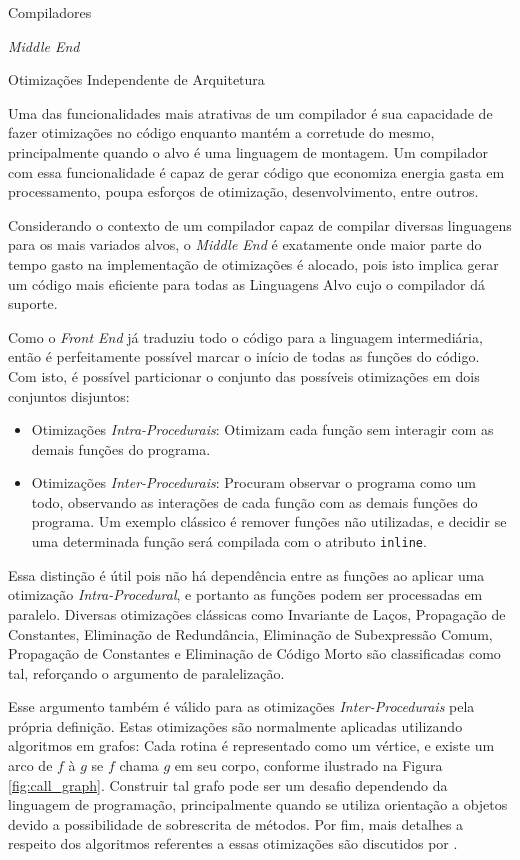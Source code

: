 \begin{section}{Compiladores}
\begin{subsection}{\textit{Middle End}}
\begin{subsubsection}{Otimizações Independente de Arquitetura}

Uma das funcionalidades mais atrativas de um compilador é sua
capacidade de fazer otimizações no código enquanto mantém
a corretude do mesmo, principalmente quando
o alvo é uma linguagem de montagem. Um compilador com essa
funcionalidade é capaz de gerar código que economiza energia
gasta em processamento, poupa esforços de otimização, desenvolvimento,
entre outros.

Considerando o contexto de um compilador capaz de compilar
diversas linguagens para os mais variados alvos, o \textit{Middle End} é
exatamente onde maior parte do tempo gasto na implementação de otimizações é
alocado, pois isto implica gerar um código mais
eficiente para todas as Linguagens Alvo cujo o compilador dá suporte.

Como o \textit{Front End} já traduziu todo o código para a linguagem
intermediária, então é perfeitamente possível marcar o início de
todas as funções do código. Com isto, é possível particionar o
conjunto das possíveis otimizações em dois conjuntos disjuntos:

\begin{itemize}
    \item Otimizações \textit{Intra-Procedurais}: Otimizam cada função sem
interagir com as demais funções do programa.

    \item Otimizações \textit{Inter-Procedurais}: Procuram observar o programa
como um todo, observando as interações de cada função com as demais
funções do programa. Um exemplo clássico é remover funções não utilizadas, e
decidir se uma determinada função será compilada com o atributo \texttt{inline}.
\end{itemize}
Essa distinção é útil pois não há dependência entre as funções
ao aplicar uma otimização \textit{Intra-Procedural}, e portanto as
funções podem ser processadas em paralelo.
Diversas otimizações
clássicas como Invariante de Laços, Propagação de Constantes,
Eliminação de Redundância, Eliminação de Subexpressão Comum,
Propagação de Constantes e Eliminação de Código Morto são
classificadas como tal, reforçando o argumento de paralelização.

Esse argumento também é válido para as otimizações \textit{Inter-Procedurais} pela
própria definição. Estas otimizações são normalmente aplicadas
utilizando algoritmos em grafos:
Cada rotina é representado como um vértice, e existe um arco de $f$
à $g$ se $f$ chama $g$ em seu corpo, conforme ilustrado na Figura
\ref{fig:call_graph}. Construir tal grafo pode ser
um desafio dependendo da linguagem de programação, principalmente
quando se utiliza orientação a objetos devido a possibilidade de
sobrescrita de métodos. Por fim, mais detalhes a respeito dos 
algoritmos referentes a essas otimizações são discutidos por
\cite{khedker2009data}.


\end{subsubsection}
\end{subsection}
\end{section}
